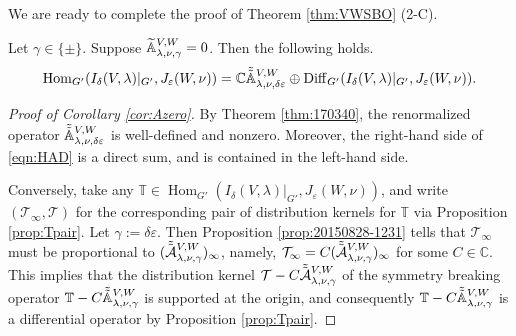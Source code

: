 We are ready to complete the proof
 of Theorem \ref{thm:VWSBO} (2-C).  
\begin{corollary}
\label{cor:Azero}
Let $\gamma \in \{\pm\}$.  
Suppose ${\widetilde{\mathbb{A}}}_{{\lambda},{\nu},{\gamma}}^{{V,W}}=0$.  
Then the following holds.  
\begin{equation}
\label{eqn:HAD}
  {\operatorname{Hom}}_{G'}(I_{\delta}(V,\lambda)|_{G'}, J_{\varepsilon}(W,\nu))  =
  {\mathbb{C}} \tilde{\tilde{{\mathbb{A}}}}_{{\lambda},{\nu},{\delta\varepsilon}}^{{V,W}}
  \oplus
  {\operatorname{Diff}}_{G'}(I_{\delta}(V,\lambda)|_{G'}, 
 J_{\varepsilon}(W,\nu)).  
\end{equation}
\end{corollary}

\begin{proof}
[Proof of Corollary \ref{cor:Azero}]
By Theorem \ref{thm:170340}, 
 the renormalized operator $\tilde{\tilde{{\mathbb{A}}}}_{{\lambda},{\nu},{\delta\varepsilon}}^{{V,W}}$
 is well-defined and nonzero.  
Moreover,
 the right-hand side of \eqref{eqn:HAD}
 is a direct sum, 
 and is contained in the left-hand side.  



Conversely,
 take any ${\mathbb{T}} \in  {\operatorname{Hom}}_{G'}(I_{\delta}(V,\lambda)|_{G'}, J_{\varepsilon}(W,\nu))$, 
 and write $({\mathcal{T}}_{\infty}, {\mathcal{T}})$
 for the corresponding pair
 of distribution kernels for ${\mathbb{T}}$ 
 via Proposition \ref{prop:Tpair}.  
Let $\gamma := \delta\varepsilon$.  
Then Proposition \ref{prop:20150828-1231} tells 
 that ${\mathcal{T}}_{\infty}$ must be proportional
 to $(\tilde{\tilde{{\mathcal{A}}}}_{{\lambda},{\nu},{\gamma}}^{{V,W}})_{\infty}$, 
 namely, 
 ${\mathcal{T}}_{\infty}=C(\tilde{\tilde{{\mathcal{A}}}}_{{\lambda},{\nu},{\gamma}}^{{V,W}})_{\infty}$
 for some $C \in {\mathbb{C}}$.  
This implies 
 that the distribution kernel 
 ${\mathcal{T}} - C \tilde{\tilde{{\mathcal{A}}}}_{{\lambda},{\nu},{\gamma}}^{{V,W}}$
 of the symmetry breaking operator
 ${\mathbb{T}}-C \tilde{\tilde{{\mathbb{A}}}}_{{\lambda},{\nu},{\gamma}}^{{V,W}}$
 is supported
 at the origin,
 and consequently
 ${\mathbb{T}}-C \tilde{\tilde{{\mathbb{A}}}}_{{\lambda},{\nu},{\gamma}}^{{V,W}}$
 is a differential operator
 by Proposition \ref{prop:Tpair}.  
\end{proof}




